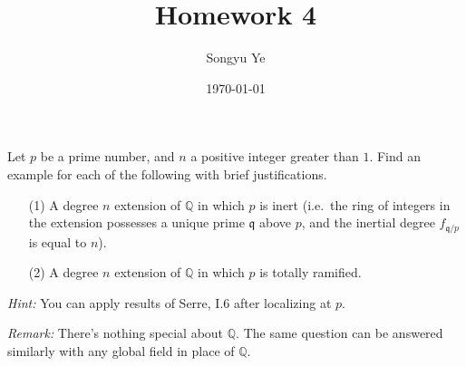 \documentclass[12pt]{article}  %
\title{Homework 4}
\author{Songyu Ye}
\date{\today}
\begin{document}
\psettitle

\begin{problem}
Let $p$ be a prime number, and $n$ a positive integer greater than $1$. Find an example for each of the following with brief justifications.
\begin{enumerate}
    \item[(1)] A degree $n$ extension of $\mathbb{Q}$ in which $p$ is inert (i.e.\ the ring of integers in the extension possesses a unique prime $\mathfrak{q}$ above $p$, and the inertial degree $f_{\mathfrak{q}/p}$ is equal to $n$).
    \item[(2)] A degree $n$ extension of $\mathbb{Q}$ in which $p$ is totally ramified.
\end{enumerate}
\textit{Hint:} You can apply results of Serre, I.6 after localizing at $p$.

\textit{Remark:} There’s nothing special about $\mathbb{Q}$. The same question can be answered similarly with any global field in place of $\mathbb{Q}$.
\end{problem}

\begin{solution}
\end{solution}

\bigskip
\end{document}
